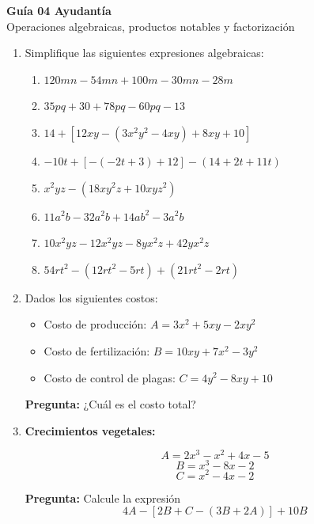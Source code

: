 \documentclass[11pt]{article}
\begin{document}
	
	\vspace*{1em}
	
	\begin{center}
		{\Large \textbf{Guía 04 Ayudantía}}\\[0.3em]
		{\small Operaciones algebraicas, productos notables y factorización}
	\end{center}
	
	
	
	\begin{enumerate}
		\item Simplifique las siguientes expresiones algebraicas:
		\begin{enumerate}[label=\alph*)]
			\item $120mn - 54mn + 100m - 30mn - 28m$
			\item $35pq + 30 + 78pq - 60pq - 13$
			\item $14 + [12xy - (3x^2y^2 - 4xy) + 8xy + 10]$
			\item $-10t + [-(-2t + 3) + 12] - (14 + 2t + 11t)$
			\item $x^2yz - (18xy^2z + 10xyz^2)$
			\item $11a^2b - 32a^2b + 14ab^2 - 3a^2b$
			\item $10x^2yz - 12x^2yz - 8yx^2z + 42yx^2z$
			\item $54rt^2 - (12rt^2 - 5rt) + (21rt^2 - 2rt)$
		\end{enumerate}
		
		\item Dados los siguientes costos:
		
		\begin{itemize}
			\item Costo de producción: $A = 3x^2 + 5xy - 2xy^2$
			\item Costo de fertilización: $B = 10xy + 7x^2 - 3y^2$
			\item Costo de control de plagas: $C = 4y^2 - 8xy + 10$
		\end{itemize}
		
		\textbf{Pregunta:} ¿Cuál es el costo total?
		
		\item \textbf{Crecimientos vegetales:}
		
		\[
		A = 2x^3 - x^2 + 4x - 5
		\]
		\[
		B = x^3 - 8x - 2
		\]
		\[
		C = x^2 - 4x - 2
		\]
		
		\textbf{Pregunta:} Calcule la expresión 
		\[
		4A - [2B + C - (3B + 2A)] + 10B
		\]
		

\end{enumerate}
\end{document}
